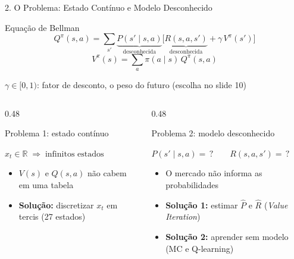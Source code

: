 \documentclass[aspectratio=169,10pt,t]{beamer}
\newenvironment{altura}[2][c]{\begin{minipage}[t][#2][#1]{\linewidth}}{\end{minipage}}
\begin{document}
\begin{frame}{2. O Problema: Estado Contínuo e Modelo Desconhecido}

  \begin{block}{Equação de Bellman}
    \[
      Q^\pi(s,a) = \sum_{s'} \underbrace{P(s' \mid s, a)}_{\text{desconhecida}} \Big[ \underbrace{R(s,a,s')}_{\text{desconhecida}} + \gamma\, V^\pi(s') \Big]
    \]
    \[
      V^\pi(s) = \sum_{a} \pi(a \mid s)\, Q^\pi(s,a)
    \]
    {\centering\footnotesize $\gamma \in [0, 1)$: fator de desconto, o peso do futuro (escolha no slide 10)\par}
  \end{block}

  \vskip -0.2cm

  \begin{columns}[T,onlytextwidth]
    \begin{column}{0.48\textwidth}
      \begin{alertblock}{Problema 1: estado contínuo}
        \begin{altura}[t]{2.3cm}
        {\centering $x_t \in \mathbb{R} \;\Rightarrow\; \text{infinitos estados}$\par}
        \vskip 6pt
        \footnotesize
        \begin{itemize}\setlength{\itemsep}{3pt}
          \item $V(s)$ e $Q(s,a)$ não cabem em uma tabela
          \item \textbf{Solução:} discretizar $x_t$ em tercis (27 estados)
        \end{itemize}
        \end{altura}
      \end{alertblock}
    \end{column}

    \begin{column}{0.48\textwidth}
      \begin{alertblock}{Problema 2: modelo desconhecido}
        \begin{altura}[t]{2.3cm}
        {\centering $P(s' \mid s,a) = \,?\qquad R(s,a,s') = \,?$\par}
        \vskip 6pt
        \footnotesize
        \begin{itemize}\setlength{\itemsep}{3pt}
          \item O mercado não informa as probabilidades
          \item \textbf{Solução 1:} estimar $\widehat{P}$ e $\widehat{R}$ (\textit{Value Iteration})
          \item \textbf{Solução 2:} aprender sem modelo (MC e Q-learning)
        \end{itemize}
        \end{altura}
      \end{alertblock}
    \end{column}
  \end{columns}

\end{frame}
\end{document}
